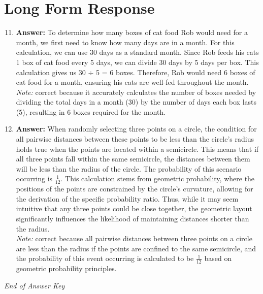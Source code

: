 \documentclass[12pt]{article}
\begin{document}
\section*{Long Form Response}
\begin{enumerate}[label=\arabic*.]
\setcounter{enumi}{10}
\item \textbf{Answer:} To determine how many boxes of cat food Rob would need for a month, we first need to know how many days are in a month. For this calculation, we can use 30 days as a standard month. Since Rob feeds his cats 1 box of cat food every 5 days, we can divide 30 days by 5 days per box. This calculation gives us 30 \ensuremath{\div} 5 = 6 boxes. Therefore, Rob would need 6 boxes of cat food for a month, ensuring his cats are well-fed throughout the month.
\\ \textit{Note:} correct because it accurately calculates the number of boxes needed by dividing the total days in a month (30) by the number of days each box lasts (5), resulting in 6 boxes required for the month.
\item \textbf{Answer:} When randomly selecting three points on a circle, the condition for all pairwise distances between these points to be less than the circle's radius holds true when the points are located within a semicircle. This means that if all three points fall within the same semicircle, the distances between them will be less than the radius of the circle. The probability of this scenario occurring is \(\frac{1}{12}\). This calculation stems from geometric probability, where the positions of the points are constrained by the circle's curvature, allowing for the derivation of the specific probability ratio. Thus, while it may seem intuitive that any three points could be close together, the geometric layout significantly influences the likelihood of maintaining distances shorter than the radius.
\\ \textit{Note:} correct because all pairwise distances between three points on a circle are less than the radius if the points are confined to the same semicircle, and the probability of this event occurring is calculated to be \(\frac{1}{12}\) based on geometric probability principles.
\end{enumerate}

\vfill
\noindent\textit{End of Answer Key}
\end{document}
